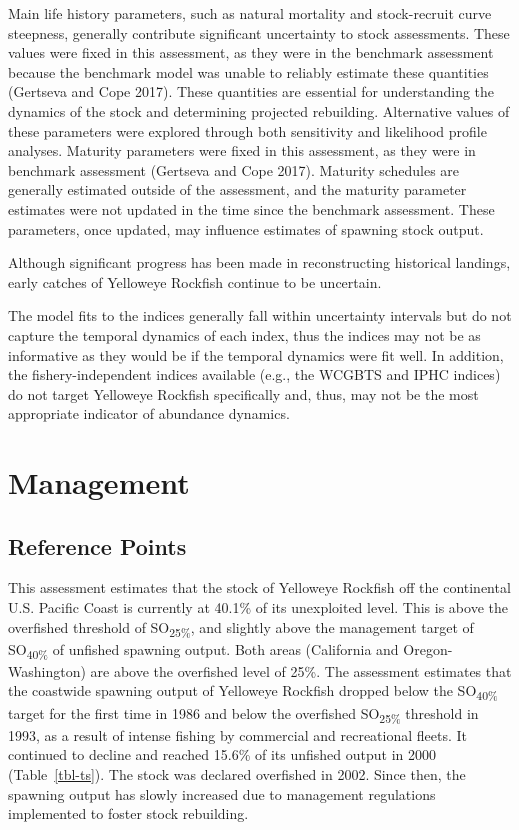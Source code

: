 \documentclass[
  english,
]{article}
\begin{document}
Main life history parameters, such as natural mortality and
stock-recruit curve steepness, generally contribute significant
uncertainty to stock assessments. These values were fixed in this
assessment, as they were in the benchmark assessment because the
benchmark model was unable to reliably estimate these quantities
(Gertseva and Cope 2017). These quantities are essential for
understanding the dynamics of the stock and determining projected
rebuilding. Alternative values of these parameters were explored through
both sensitivity and likelihood profile analyses. Maturity parameters
were fixed in this assessment, as they were in benchmark assessment
(Gertseva and Cope 2017). Maturity schedules are generally estimated
outside of the assessment, and the maturity parameter estimates were not
updated in the time since the benchmark assessment. These parameters,
once updated, may influence estimates of spawning stock output.

Although significant progress has been made in reconstructing historical
landings, early catches of Yelloweye Rockfish continue to be uncertain.

The model fits to the indices generally fall within uncertainty
intervals but do not capture the temporal dynamics of each index, thus
the indices may not be as informative as they would be if the temporal
dynamics were fit well. In addition, the fishery-independent indices
available (e.g., the WCGBTS and IPHC indices) do not target Yelloweye
Rockfish specifically and, thus, may not be the most appropriate
indicator of abundance dynamics.

\newpage{}

\section{Management}\label{management}

\subsection{Reference Points}\label{reference-points-1}

This assessment estimates that the stock of Yelloweye Rockfish off the
continental U.S. Pacific Coast is currently at 40.1\% of its unexploited
level. This is above the overfished threshold of SO\textsubscript{25\%},
and slightly above the management target of SO\textsubscript{40\%} of
unfished spawning output. Both areas (California and Oregon-Washington)
are above the overfished level of 25\%. The assessment estimates that
the coastwide spawning output of Yelloweye Rockfish dropped below the
SO\textsubscript{40\%} target for the first time in 1986 and below the
overfished SO\textsubscript{25\%} threshold in 1993, as a result of
intense fishing by commercial and recreational fleets. It continued to
decline and reached 15.6\% of its unfished output in 2000
(Table~\ref{tbl-ts}). The stock was declared overfished in 2002. Since
then, the spawning output has slowly increased due to management
regulations implemented to foster stock rebuilding.
\end{document}
